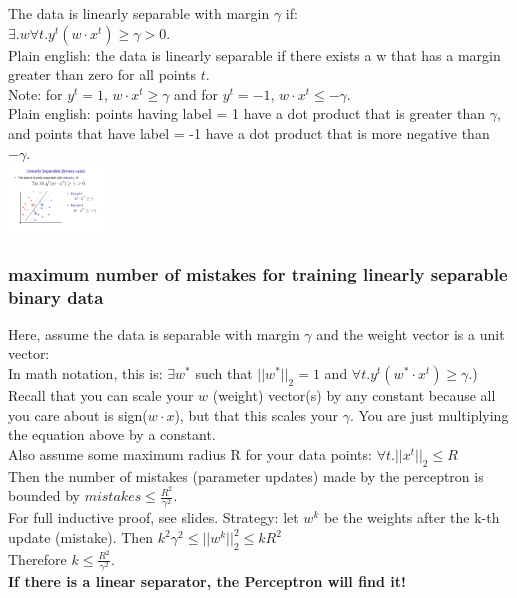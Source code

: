  The data is linearly separable with margin $\gamma$ if:   \hfill \\
$\exists .w \forall t . y^t (w \cdot x^t) \geq \gamma > 0$.  \hfill \\
Plain english: the data is linearly separable if there exists a w that has a margin greater than zero for all points $t$.  \hfill \\
Note: for $y^t = 1$, $w \cdot x^t \geq \gamma$ and for $y^t = -1$, $w \cdot x^t \leq -\gamma$.  \hfill \\
Plain english: points having label = 1 have a dot product that is greater than $\gamma$, and points that have label = -1 have a dot product that is more negative than $-\gamma$.  \hfill \\
 \includegraphics[width=1.0in]{figures/lin_sep_margin.pdf}
 
 \subsubsection{maximum number of mistakes for training linearly separable binary data}
Here, assume the data is separable with margin $\gamma$ and the weight vector is a unit vector: \hfill \\
In math notation, this is: $\exists w^*$ such that $||w^*||_2 = 1$ and $\forall t. y^t(w^* \cdot x^t) \geq \gamma$.) \hfill \\
Recall that you can scale your $w$ (weight) vector(s) by any constant because all you care about is sign($w \cdot x$),
but that this scales your $\gamma$.  You are just multiplying the equation above by a constant.  \hfill \\

Also assume some maximum radius R for your data points:  
$\forall t. ||x^t||_2 \leq R$ \hfill \\
Then the number of mistakes (parameter updates) made by the perceptron is bounded by 
$\displaystyle mistakes \leq \frac{R^2}{\gamma^2}$. \hfill \\
For full inductive proof, see slides.  
Strategy: let $w^k$ be the weights after the k-th update (mistake).  
Then $k^2 \gamma^2 \leq ||w^k||_2^2 \leq k R^2$ \hfill \\
Therefore $k \leq \frac{R^2}{\gamma^2}$.  \hfill \\
\textbf{If there is a linear separator, the Perceptron will find it!}
		
